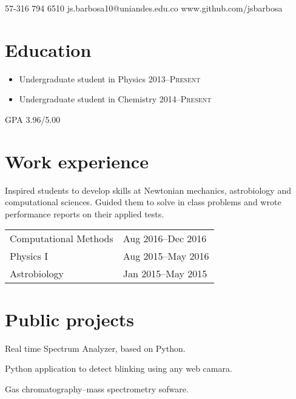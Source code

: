 \documentclass{my_cv}
\begin{document}
{57-316 794 6510}
{js.barbosa10@uniandes.edu.co}
{www.github.com/jsbarbosa}


\section{Education}
\begin{itemize}
	\item Undergraduate student in Physics \hfil \textsc{2013--Present}
	\item Undergraduate student in Chemistry \hfil \textsc{2014--Present}
\end{itemize}

\textsc{GPA 3.96/5.00}

\section{Work experience}
Inspired students to develop skills at Newtonian mechanics, astrobiology and computational sciences. Guided them to solve in class problems and wrote performance reports on their applied tests.

{\scshape
\begin{tabular}{l@{\hskip 1in}l}
	Computational Methods & Aug 2016--Dec 2016 \\
	Physics I & Aug 2015--May 2016 \\
	Astrobiology & Jan 2015--May 2015
\end{tabular}
}
\section{Public projects}
Real time Spectrum Analyzer, based on Python.

Python application to detect blinking using any web camara.

Gas chromatography--mass spectrometry sofware.
\end{document}
